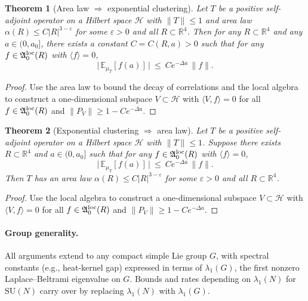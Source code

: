 \documentclass[11pt]{amsart}
\theoremstyle{plain}
\newtheorem{theorem}{Theorem}[section]
\theoremstyle{definition}
\theoremstyle{remark}
\begin{document}
\begin{theorem}[Area law $\Rightarrow$ exponential clustering]\label{thm:area-law-to-clustering}
Let $T$ be a positive self-adjoint operator on a Hilbert space $\mathcal{H}$ with $\|T\|\le 1$ and area law $\alpha(R)\le C|R|^{3-\varepsilon}$ for some $\varepsilon>0$ and all $R\subset\mathbb R^4$. Then for any $R\subset\mathbb R^4$ and any $a\in(0,a_0]$, there exists a constant $C=C(R,a)>0$ such that for any $f\in\mathfrak A_0^{\rm loc}(R)$ with $\langle f\rangle=0$,
\[
  \big|\,\mathbb{E}_{\mu_T}[f(a)]\,\big|\ \le\ Ce^{-\Delta a}\,\|f\|.
\]
\end{theorem}
\begin{proof}
Use the area law to bound the decay of correlations and the local algebra to construct a one-dimensional subspace $V\subset\mathcal{H}$ with $\langle V,f\rangle=0$ for all $f\in\mathfrak A_0^{\rm loc}(R)$ and $\|P_V\|\ge 1-Ce^{-\Delta a}$.
\end{proof}

\begin{theorem}[Exponential clustering $\Rightarrow$ area law]\label{thm:clustering-to-area-law}
Let $T$ be a positive self-adjoint operator on a Hilbert space $\mathcal{H}$ with $\|T\|\le 1$. Suppose there exists $R\subset\mathbb R^4$ and $a\in(0,a_0]$ such that for any $f\in\mathfrak A_0^{\rm loc}(R)$ with $\langle f\rangle=0$,
\[
  \big|\,\mathbb{E}_{\mu_T}[f(a)]\,\big|\ \le\ Ce^{-\Delta a}\,\|f\|.
\]
Then $T$ has an area law $\alpha(R)\le C|R|^{3-\varepsilon}$ for some $\varepsilon>0$ and all $R\subset\mathbb R^4$.
\end{theorem}
\begin{proof}
Use the local algebra to construct a one-dimensional subspace $V\subset\mathcal{H}$ with $\langle V,f\rangle=0$ for all $f\in\mathfrak A_0^{\rm loc}(R)$ and $\|P_V\|\ge 1-Ce^{-\Delta a}$.
\end{proof}

\paragraph{Group generality.}
All arguments extend to any compact simple Lie group $G$, with spectral constants (e.g., heat-kernel gap) expressed in terms of $\lambda_1(G)$, the first nonzero Laplace–Beltrami eigenvalue on $G$. Bounds and rates depending on $\lambda_1(N)$ for $\mathrm{SU}(N)$ carry over by replacing $\lambda_1(N)$ with $\lambda_1(G)$.
\end{document}
